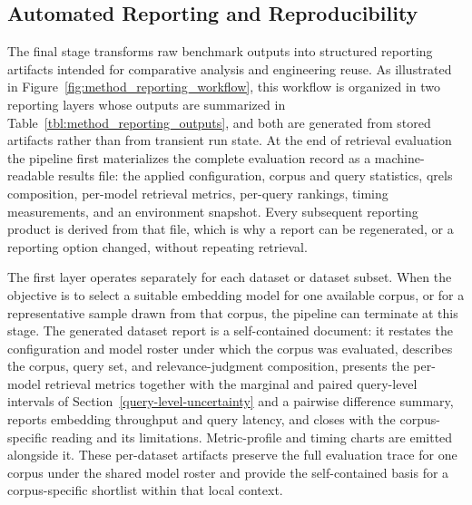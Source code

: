\subsection{Automated Reporting and Reproducibility}\label{automated-reporting-and-reproducibility}

The final stage transforms raw benchmark outputs into structured reporting artifacts intended for comparative analysis and engineering reuse. As illustrated in Figure~\ref{fig:method_reporting_workflow}, this workflow is organized in two reporting layers whose outputs are summarized in Table~\ref{tbl:method_reporting_outputs}, and both are generated from stored artifacts rather than from transient run state. At the end of retrieval evaluation the pipeline first materializes the complete evaluation record as a machine-readable results file: the applied configuration, corpus and query statistics, qrels composition, per-model retrieval metrics, per-query rankings, timing measurements, and an environment snapshot. Every subsequent reporting product is derived from that file, which is why a report can be regenerated, or a reporting option changed, without repeating retrieval.

The first layer operates separately for each dataset or dataset subset. When the objective is to select a suitable embedding model for one available corpus, or for a representative sample drawn from that corpus, the pipeline can terminate at this stage. The generated dataset report is a self-contained document: it restates the configuration and model roster under which the corpus was evaluated, describes the corpus, query set, and relevance-judgment composition, presents the per-model retrieval metrics together with the marginal and paired query-level intervals of Section~\ref{query-level-uncertainty} and a pairwise difference summary, reports embedding throughput and query latency, and closes with the corpus-specific reading and its limitations. Metric-profile and timing charts are emitted alongside it. These per-dataset artifacts preserve the full evaluation trace for one corpus under the shared model roster and provide the self-contained basis for a corpus-specific shortlist within that local context.

